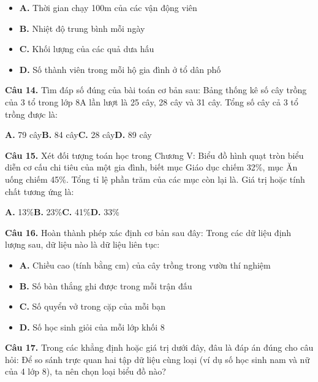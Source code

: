 \documentclass[11pt,a4paper]{article}
\begin{document}
\begin{itemize}\setlength{\itemsep}{1pt}\setlength{\parskip}{0pt}
  \item[] \textbf{A.} Thời gian chạy 100m của các vận động viên
  \item[] \textbf{B.} Nhiệt độ trung bình mỗi ngày
  \item[] \textbf{C.} Khối lượng của các quả dưa hấu
  \item[] \textbf{D.} Số thành viên trong mỗi hộ gia đình ở tổ dân phố
\end{itemize}\vspace{2pt}
\textbf{\color{primary} Câu 14.} Tìm đáp số đúng của bài toán cơ bản sau: Bảng thống kê số cây trồng của 3 tổ trong lớp 8A lần lượt là 25 cây, 28 cây và 31 cây. Tổng số cây cả 3 tổ trồng được là:\par
\hspace*{1.5em}\textbf{A.} 79 cây\quad\quad \textbf{B.} 84 cây\quad\quad \textbf{C.} 28 cây\quad\quad \textbf{D.} 89 cây\par\vspace{2pt}
\textbf{\color{primary} Câu 15.} Xét đối tượng toán học trong Chương V: Biểu đồ hình quạt tròn biểu diễn cơ cấu chi tiêu của một gia đình, biết mục Giáo dục chiếm 32\%, mục Ăn uống chiếm 45\%. Tổng tỉ lệ phần trăm của các mục còn lại là. Giá trị hoặc tính chất tương ứng là:\par
\hspace*{1.5em}\textbf{A.} 13\%\quad\quad \textbf{B.} 23\%\quad\quad \textbf{C.} 41\%\quad\quad \textbf{D.} 33\%\par\vspace{2pt}
\textbf{\color{primary} Câu 16.} Hoàn thành phép xác định cơ bản sau đây: Trong các dữ liệu định lượng sau, dữ liệu nào là dữ liệu liên tục:\par
\begin{itemize}\setlength{\itemsep}{1pt}\setlength{\parskip}{0pt}
  \item[] \textbf{A.} Chiều cao (tính bằng cm) của cây trồng trong vườn thí nghiệm
  \item[] \textbf{B.} Số bàn thắng ghi được trong mỗi trận đấu
  \item[] \textbf{C.} Số quyển vở trong cặp của mỗi bạn
  \item[] \textbf{D.} Số học sinh giỏi của mỗi lớp khối 8
\end{itemize}\vspace{2pt}
\textbf{\color{primary} Câu 17.} Trong các khẳng định hoặc giá trị dưới đây, đâu là đáp án đúng cho câu hỏi: Để so sánh trực quan hai tập dữ liệu cùng loại (ví dụ số học sinh nam và nữ của 4 lớp 8), ta nên chọn loại biểu đồ nào?\par
\end{document}
